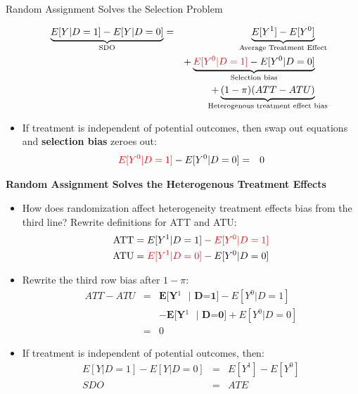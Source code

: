 \documentclass{beamer}
\begin{document}
\begin{frame}{Random Assignment Solves the Selection Problem}

  \begin{eqnarray*}
    \underbrace{E[Y|D=1] - E[Y|D=0]}_{ \mathclap{\text{SDO}}}&=& \underbrace{E[Y^1] - E[Y^0]}_{ \mathclap{\text{Average Treatment Effect}}} \\
    &&+ \underbrace{\textcolor{red}{E[Y^0|D=1]} - E[Y^0 | D=0]}_{ \mathclap{\text{Selection bias}}}  \\
    && + \underbrace{(1-\pi)(ATT - ATU)}_{ \mathclap{\text{Heterogenous treatment effect bias}}}
  \end{eqnarray*}


  \begin{itemize}
    \item If treatment is independent of potential outcomes, then swap out equations and \textbf{selection bias} zeroes out:
          \begin{eqnarray*}
            \textcolor{red}{E[Y^0 | D=1]} - E[Y^0 | D=0] &=& 0
          \end{eqnarray*}
  \end{itemize}

\end{frame}

\begin{frame}[shrink=20,plain]
  \begin{center}
    \textbf{Random Assignment Solves the Heterogenous Treatment Effects}
  \end{center}

  \begin{itemize}
    \item How does randomization affect heterogeneity treatment effects bias from the third line?  Rewrite definitions for ATT and ATU:\begin{eqnarray*}
            \text{ATT} = E[Y^1 | D=1] - \textcolor{red}{E[Y^0 | D=1]} \\
            \text{ATU} = \textcolor{red}{E[Y^1 | D=0]} - E[Y^0 | D=0] \\
          \end{eqnarray*}
    \item Rewrite the third row bias after $1-\pi$:\begin{eqnarray*}
            ATT - ATU &=& \textbf{E[Y$^1$ $|$ D=1]} - E[Y^0 | D=1] \\
            && - \textbf{E[Y$^1$ $|$ D=0]} + E[Y^0 | D=0] \\
            &=& 0
          \end{eqnarray*}
    \item If treatment is independent of potential outcomes, then:\begin{eqnarray*}
            E[Y | D=1] - E[Y |D=0]  &=& E[Y^1] - E[Y^0] \\
            SDO &=& ATE
          \end{eqnarray*}
  \end{itemize}
\end{frame}
\end{document}
